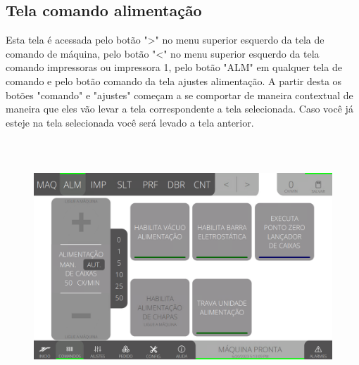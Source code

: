 \thispagestyle{fancy}
\vspace*{40 pt}
\subsection{Tela comando alimentação}\label{miniTelaComandoAlimentacao}
 Esta tela é acessada pelo botão "\textgreater" no menu superior esquerdo da tela de comando de máquina, pelo botão "\textless{}" no menu superior esquerdo da tela 
 comando impressoras ou impressora 1, pelo botão "ALM" em qualquer tela de comando e pelo botão comando da tela ajustes alimentação. A partir desta os botões "comando" 
 e "ajustes" começam a se comportar de maneira contextual de maneira que eles vão levar a tela correspondente a tela selecionada. Caso você já esteje na tela selecionada 
 você será levado a tela anterior.
 \vspace*{\fill}
\begin{figure}[h]
  \centering
  \includegraphics[width=576px,height=360px]{src/imagesMiniline/03-Feeder/commands/e0.png}
\end{figure}
\vspace*{\fill}

\newpage
\thispagestyle{fancy}
\vspace*{40 pt}
